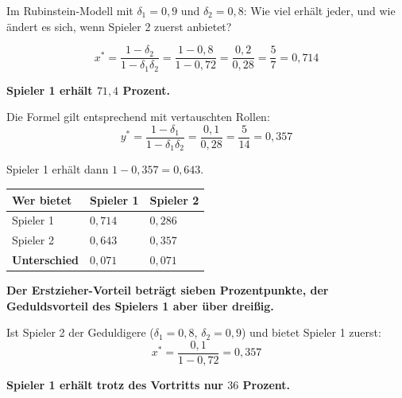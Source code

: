 \begin{aufgabe}
Im Rubinstein-Modell mit $\delta_1 = 0{,}9$ und $\delta_2 = 0{,}8$: Wie viel erhält jeder, und wie ändert es sich, wenn Spieler 2 zuerst anbietet?

\loesung
{}
\[ x^{*} = \frac{1-\delta_2}{1-\delta_1\delta_2} = \frac{1-0{,}8}{1-0{,}72} = \frac{0{,}2}{0{,}28} = \frac57 = 0{,}714 \]

\begin{center}
\begin{minipage}{0.9\textwidth}
\textbf{Spieler 1 erhält $71{,}4$ Prozent.}
\end{minipage}
\end{center}

Die Formel gilt entsprechend mit vertauschten Rollen:
\[ y^{*} = \frac{1-\delta_1}{1-\delta_1\delta_2} = \frac{0{,}1}{0{,}28} = \frac{5}{14} = 0{,}357 \]

Spieler 1 erhält dann $1-0{,}357 = 0{,}643$.

\begin{center}
{\small
\renewcommand{\arraystretch}{1.5}
\begin{tabular}{@{}P{2.6cm}P{2.0cm}P{2.0cm}@{}}
\toprule
\textbf{Wer bietet} & \textbf{Spieler 1} & \textbf{Spieler 2}\\
\midrule
Spieler 1 & $0{,}714$ & $0{,}286$\\
Spieler 2 & $0{,}643$ & $0{,}357$\\
\midrule
\textbf{Unterschied} & $0{,}071$ & $0{,}071$\\
\bottomrule
\end{tabular}}
\end{center}

\begin{center}
\begin{minipage}{0.9\textwidth}
\textbf{Der Erstzieher-Vorteil beträgt sieben Prozentpunkte, der Geduldsvorteil des Spielers 1 aber über dreißig.}
\end{minipage}
\end{center}

Ist Spieler 2 der Geduldigere ($\delta_1=0{,}8$, $\delta_2=0{,}9$) und bietet Spieler 1 zuerst:
\[ x^{*} = \frac{0{,}1}{1-0{,}72} = 0{,}357 \]

\begin{center}
\begin{minipage}{0.9\textwidth}
\textbf{Spieler 1 erhält trotz des Vortritts nur $36$ Prozent.}
\end{minipage}
\end{center}


\end{aufgabe}
